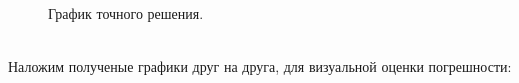 \documentclass[12pt]{article}
\begin{document}
\begin{itemize}
\begin{figure}[!h]
\begin{minipage}[h]{0.5\linewidth}
            \end{minipage}
            \hfill
            \begin{minipage}[h]{0.5\linewidth}
            \end{minipage}
            \caption{График точного решения.}
        \end{figure}
        \\Наложим полученые графики друг на друга, для визуальной оценки погрешности:
        \begin{figure}[!h]
            \begin{minipage}[h]{0.5\linewidth}

\end{minipage}
\end{figure}
\end{itemize}
\end{document}
